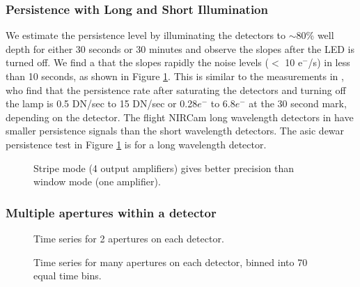 \documentclass{aastex62}
\begin{document}
{\subsubsection{Persistence with Long and Short Illumination}
We estimate the persistence level by illuminating the detectors to $\sim$80\% well depth for either 30 seconds or 30 minutes and observe the slopes after the LED is turned off.
We find a that the slopes rapidly the noise levels ($<$ 10 e$^-$/s) in less than 10 seconds, as shown in Figure \ref{fig:persistenceAZlab04}.
This is similar to the measurements in \citet{leisenring2016persistence}, who find that the persistence rate after saturating the detectors and turning off the lamp is 0.5 DN/sec to 15 DN/sec or 0.28$e^-$ to 6.8$e^-$ at the 30 second mark, depending on the detector.
The flight NIRCam long wavelength detectors in \citet{leisenring2016persistence} have smaller persistence signals than the short wavelength detectors.
The asic dewar persistence test in Figure \ref{fig:persistenceAZlab04} is for a long wavelength detector.

\begin{figure}
{}
\caption{Stripe mode (4 output amplifiers) gives better precision than window mode (one amplifier).}\label{fig:persistenceAZlab04}
\end{figure}

\clearpage
\subsubsection{Multiple apertures within a detector}
\begin{figure}
{}
{}
{}
\caption{Time series for 2 apertures on each detector.}\label{fig:twoApPerDetector}
\end{figure}

\begin{figure}
{}
{}
{}
\caption{Time series for many apertures on each detector, binned into 70 equal time bins.}\label{fig:manyApPerDetector}
\end{figure}

}
\end{document}
